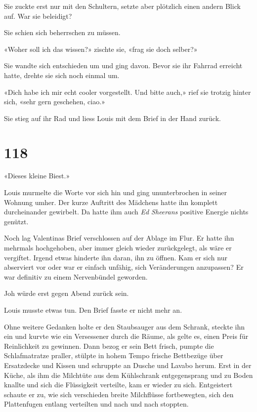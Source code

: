 Sie zuckte erst nur mit den Schultern, setzte aber plötzlich einen
andern Blick auf. War sie beleidigt?

Sie schien sich beherrschen zu müssen.

«Woher soll ich das wissen?» zischte sie, «frag sie doch selber?»

Sie wandte sich entschieden um und ging davon. Bevor sie ihr Fahrrad
erreicht hatte, drehte sie sich noch einmal um.

«Dich habe ich mir echt cooler vorgestellt. Und bitte auch,» rief sie
trotzig hinter sich, «sehr gern geschehen, ciao.»

Sie stieg auf ihr Rad und liess Louis mit dem Brief in der Hand zurück.

\chapter{118}\label{section-118}

«Dieses kleine Biest.»

Louis murmelte die Worte vor sich hin und ging ununterbrochen in seiner
Wohnung umher. Der kurze Auftritt des Mädchens hatte ihn komplett
durcheinander gewirbelt. Da hatte ihm auch \emph{Ed Sheerans} positive
Energie nichts genützt.

Noch lag Valentinas Brief verschlossen auf der Ablage im Flur. Er hatte
ihn mehrmals hochgehoben, aber immer gleich wieder zurückgelegt, als
wäre er vergiftet. Irgend etwas hinderte ihn daran, ihn zu öffnen. Kam
er sich nur abserviert vor oder war er einfach unfähig, sich
Veränderungen anzupassen? Er war definitiv zu einem Nervenbündel
geworden.

Joh würde erst gegen Abend zurück sein.

Louis musste etwas tun. Den Brief fasste er nicht mehr an.

Ohne weitere Gedanken holte er den Staubsauger aus dem Schrank, steckte
ihn ein und kurvte wie ein Versessener durch die Räume, als gelte es,
einen Preis für Reinlichkeit zu gewinnen. Dann bezog er sein Bett
frisch, pumpte die Schlafmatratze praller, stülpte in hohem Tempo
frische Bettbezüge über Ersatzdecke und Kissen und schruppte an Dusche
und Lavabo herum. Erst in der Küche, als ihm die Milchtüte aus dem
Kühlschrank entgegensprang und zu Boden knallte und sich die Flüssigkeit
verteilte, kam er wieder zu sich. Entgeistert schaute er zu, wie sich
verschieden breite Milchflüsse fortbewegten, sich den Plattenfugen
entlang verteilten und nach und nach stoppten.

